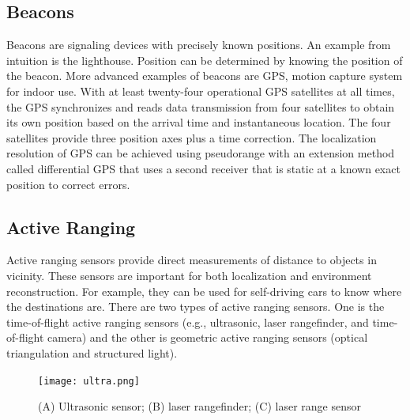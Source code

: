 \subsection{Beacons}
Beacons are signaling devices with precisely known positions. An example from intuition is the lighthouse. Position can be determined by knowing the position of the beacon. More advanced examples of beacons are GPS, motion capture system for indoor use. With at least twenty-four operational GPS satellites at all times, the GPS synchronizes and reads data transmission from four satellites to obtain its own position based on the arrival time and instantaneous location. The four satellites provide three position axes plus a time correction. The localization resolution of GPS can be achieved using pseudorange with an extension method called differential GPS that uses a second receiver that is static at a known exact position to correct errors.

\subsection{Active Ranging}

Active ranging sensors provide direct measurements of distance to objects in vicinity. These sensors are important for both localization and environment reconstruction. For example, they can be used for self-driving cars to know where the destinations are. There are two types of active ranging sensors. One is the time-of-flight active ranging sensors (e.g., ultrasonic, laser rangefinder, and time-of-flight camera) and the other is geometric active ranging sensors (optical triangulation and structured light).


\begin{figure}
\centering
\texttt{[image: ultra.png]}
\caption{(A) Ultrasonic sensor; (B) laser rangefinder; (C) laser range sensor}
\label{fig:active_range}
\end{figure}

